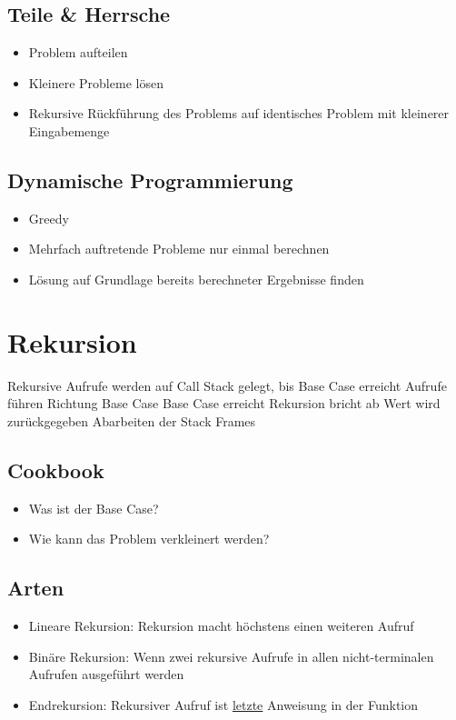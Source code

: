 \begin{multicols*}{4}
	\subsection{Teile \& Herrsche}
		\begin{itemize}
			\item Problem aufteilen
			\item Kleinere Probleme lösen
			\item Rekursive Rückführung des Problems auf identisches Problem mit kleinerer Eingabemenge
		\end{itemize}
	
	\subsection{Dynamische Programmierung}
		\begin{itemize}
			\item Greedy
			\item Mehrfach auftretende Probleme nur einmal berechnen
			\item Lösung auf Grundlage bereits berechneter Ergebnisse finden
		\end{itemize}

\columnbreak

\section{Rekursion}
	\begin{outline}
		\1 Rekursive Aufrufe werden auf Call Stack gelegt, bis Base Case erreicht
		\2 Aufrufe führen Richtung Base Case
		\1 Base Case erreicht
		\2 Rekursion bricht ab
		\2 Wert wird zurückgegeben
		\2 Abarbeiten der Stack Frames
	\end{outline}

	\subsection{Cookbook}
		\begin{itemize}
			\item Was ist der Base Case?
			\item Wie kann das Problem verkleinert werden?
		\end{itemize}
	
	\subsection{Arten}
		\begin{itemize}
			\item Lineare Rekursion: Rekursion macht höchstens einen weiteren Aufruf
			\item Binäre Rekursion: Wenn zwei rekursive Aufrufe in allen nicht-terminalen Aufrufen ausgeführt werden
			\item Endrekursion: Rekursiver Aufruf ist \underline{letzte} Anweisung in der Funktion
		\end{itemize}


\end{multicols*}
